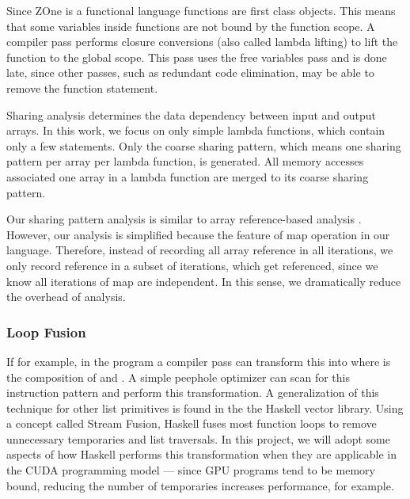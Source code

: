 Since ZOne is a functional language functions are
	first class objects.
This means that some variables inside functions are not
	bound by the function scope.
A compiler pass performs closure conversions (also called
	lambda lifting) to lift the function to the global scope.
This pass uses the free variables pass and is done late,
	since other passes, such as
	redundant code elimination, may be able to remove the
	function statement.



Sharing analysis determines the data dependency between input and output arrays.
In this work, we focus on only simple lambda functions, which contain only a few statements.
Only the coarse sharing pattern, which means one sharing pattern per array per lambda function, is generated.
All memory accesses associated one array in a lambda function are merged to its coarse sharing pattern.

Our sharing pattern analysis is similar to array reference-based analysis \cite{alg_reference}.
However, our analysis is simplified because the feature of map operation in our language.
Therefore, instead of recording all array reference in all iterations, we only record reference in a subset of iterations, which get referenced, 
since we know all iterations of map are independent. 
In this sense, we dramatically reduce the overhead of analysis.


\subsubsection{Loop Fusion}\label{loop-fusion}

If for example, in the program
 a compiler pass can transform this
into  where  is the composition of
 and . A simple peephole optimizer can scan for this
instruction pattern and perform this transformation. A generalization of
this technique for other list primitives is found in the the Haskell
vector library. Using a concept called Stream Fusion\cite{StreamFusion}, Haskell
fuses most function loops to remove unnecessary temporaries and list
traversals. In this project, we will adopt some aspects of how Haskell
performs this transformation when they are applicable in the CUDA
programming model --- since GPU programs tend to be memory bound,
reducing the number of temporaries increases performance, for example.

